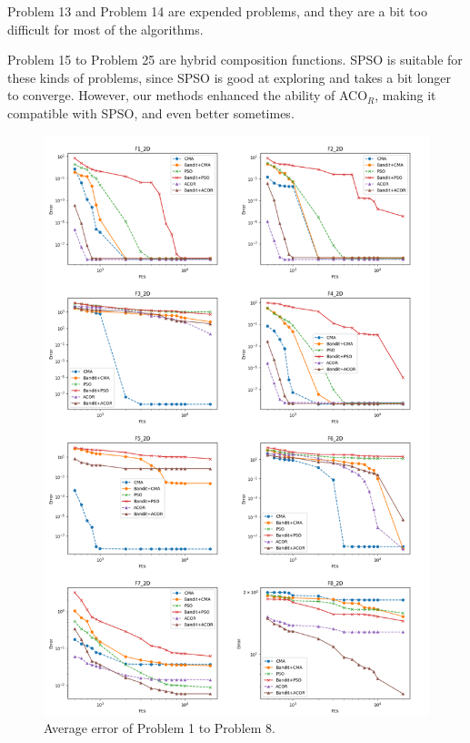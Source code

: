 Problem 13 and Problem 14 are expended problems, and they are a bit too difficult for most of the algorithms.

Problem 15 to Problem 25 are hybrid composition functions.
SPSO is suitable for these kinds of problems, since SPSO is good at exploring and takes a bit longer to converge.
However, our methods enhanced the ability of ACO$_R$, making it compatible with SPSO, and even better sometimes.



\begin{figure}
\centering
\includegraphics[width=\textwidth]{Average_F1_F8}
\caption{Average error of Problem 1 to Problem 8.}\label{fig:Average_F1_F8}
\end{figure}

